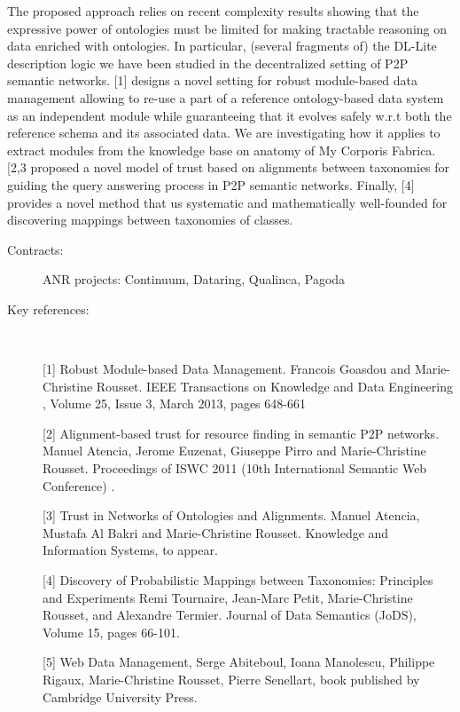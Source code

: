 The proposed approach relies on recent complexity  results showing that the expressive power of ontologies must be limited for making tractable reasoning on data enriched with ontologies. In particular,  (several fragments of) the DL-Lite description logic  we have been studied  in the decentralized setting of P2P semantic networks. [1] designs a novel setting for robust module-based data management allowing to re-use a part of a  reference ontology-based data system as an independent module while guaranteeing that it evolves safely w.r.t both the reference  schema and its associated data. We are investigating how it applies to extract modules from the knowledge base on anatomy of My Corporis Fabrica.  [2,3 proposed a novel model of trust based on alignments between taxonomies for guiding the query answering process in P2P semantic networks. Finally,  [4]  provides a novel method that us systematic and mathematically well-founded for discovering mappings between taxonomies of classes. 


\begin{description}
\item[Contracts:] ANR projects: Continuum, Dataring, Qualinca, Pagoda 
  
\item[Key references:]~%

[1] Robust Module-based Data Management. Francois Goasdou and Marie-Christine Rousset. IEEE Transactions on Knowledge and Data Engineering , Volume 25, Issue 3, March 2013, pages 648-661 

[2] Alignment-based trust for resource finding in semantic P2P networks. Manuel Atencia, Jerome Euzenat, Giuseppe Pirro and Marie-Christine Rousset. Proceedings of ISWC 2011 (10th International Semantic Web Conference) . 

[3] Trust in Networks of Ontologies and Alignments. Manuel Atencia, Mustafa Al Bakri and Marie-Christine Rousset.  Knowledge and Information Systems, to appear. 

[4] Discovery of Probabilistic Mappings between Taxonomies: Principles and Experiments Remi Tournaire, Jean-Marc Petit, Marie-Christine Rousset, and Alexandre Termier. Journal of Data Semantics (JoDS), Volume 15, pages 66-101. 

[5] Web Data Management, Serge Abiteboul, Ioana Manolescu, Philippe Rigaux, Marie-Christine Rousset, Pierre Senellart, book published by Cambridge University Press. 

\end{description}

